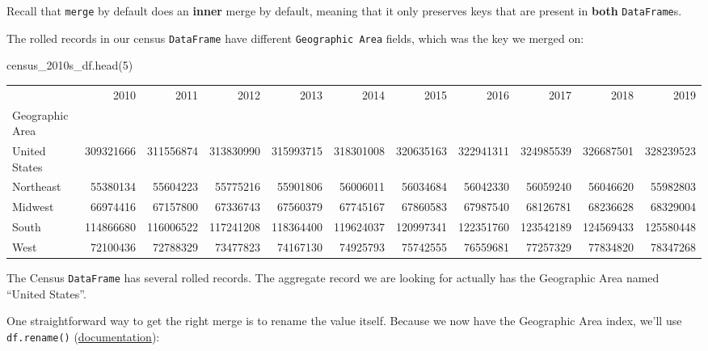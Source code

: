 \documentclass[
  letterpaper,
  DIV=11,
  numbers=noendperiod]{scrreprt}
\newenvironment{Shaded}{\begin{snugshade}}{\end{snugshade}}
\newcommand{\DecValTok}[1]{\textcolor[rgb]{0.68,0.00,0.00}{#1}}
\newcommand{\NormalTok}[1]{\textcolor[rgb]{0.00,0.23,0.31}{#1}}
\begin{document}
Recall that \texttt{merge} by default does an \textbf{inner} merge by
default, meaning that it only preserves keys that are present in
\textbf{both} \texttt{DataFrame}s.

The rolled records in our census \texttt{DataFrame} have different
\texttt{Geographic\ Area} fields, which was the key we merged on:

\begin{Shaded}
\begin{Highlighting}[]
\NormalTok{census\_2010s\_df.head(}\DecValTok{5}\NormalTok{)}
\end{Highlighting}
\end{Shaded}

\begin{tabular}{lrrrrrrrrrr}
\toprule
{} &       2010 &       2011 &       2012 &       2013 &       2014 &       2015 &       2016 &       2017 &       2018 &       2019 \\
Geographic Area &            &            &            &            &            &            &            &            &            &            \\
\midrule
United States   &  309321666 &  311556874 &  313830990 &  315993715 &  318301008 &  320635163 &  322941311 &  324985539 &  326687501 &  328239523 \\
Northeast       &   55380134 &   55604223 &   55775216 &   55901806 &   56006011 &   56034684 &   56042330 &   56059240 &   56046620 &   55982803 \\
Midwest         &   66974416 &   67157800 &   67336743 &   67560379 &   67745167 &   67860583 &   67987540 &   68126781 &   68236628 &   68329004 \\
South           &  114866680 &  116006522 &  117241208 &  118364400 &  119624037 &  120997341 &  122351760 &  123542189 &  124569433 &  125580448 \\
West            &   72100436 &   72788329 &   73477823 &   74167130 &   74925793 &   75742555 &   76559681 &   77257329 &   77834820 &   78347268 \\
\bottomrule
\end{tabular}

The Census \texttt{DataFrame} has several rolled records. The aggregate
record we are looking for actually has the Geographic Area named
``United States''.

One straightforward way to get the right merge is to rename the value
itself. Because we now have the Geographic Area index, we'll use
\texttt{df.rename()}
(\href{https://pandas.pydata.org/docs/reference/api/pandas.DataFrame.rename.html}{documentation}):
\end{document}
